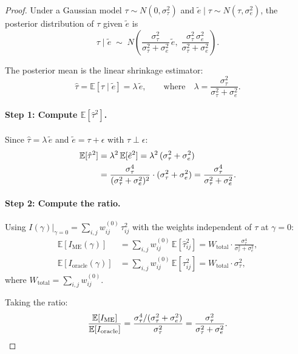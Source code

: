 \documentclass[11pt,a4paper]{article}
\theoremstyle{definition}
\begin{document}
\begin{proof}
Under a Gaussian model
$\tau\sim N(0,\sigma_\tau^2)$ and
$\tilde{e}\mid\tau\sim N(\tau,\sigma_e^2)$,
the posterior distribution of $\tau$ given $\tilde{e}$ is
\begin{equation}\label{eq:posterior}
  \tau\mid\tilde{e} \;\sim\;
  N\!\left(
    \frac{\sigma_\tau^2}{\sigma_\tau^2+\sigma_e^2}\,\tilde{e},\;
    \frac{\sigma_\tau^2\,\sigma_e^2}{\sigma_\tau^2+\sigma_e^2}
  \right).
\end{equation}

The posterior mean is the linear shrinkage estimator:
\begin{equation}\label{eq:shrinkage}
  \hat{\tau}
  = \mathbb{E}[\tau\mid\tilde{e}]
  = \lambda\,\tilde{e},
  \qquad\text{where}\quad
  \lambda = \frac{\sigma_\tau^2}{\sigma_\tau^2+\sigma_e^2}.
\end{equation}

\paragraph{Step 1: Compute $\mathbb{E}[\hat\tau^2]$.}
Since $\hat\tau = \lambda\,\tilde{e}$ and $\tilde{e} = \tau+\epsilon$
with $\tau\perp\epsilon$:
\begin{align}
  \mathbb{E}[\hat\tau^2]
  &= \lambda^2\,\mathbb{E}[\tilde{e}^2]
  = \lambda^2\,(\sigma_\tau^2+\sigma_e^2)
  \notag\\
  &= \frac{\sigma_\tau^4}{(\sigma_\tau^2+\sigma_e^2)^2}
     \cdot(\sigma_\tau^2+\sigma_e^2)
  = \frac{\sigma_\tau^4}{\sigma_\tau^2+\sigma_e^2}.
  \label{eq:E_tauhat_sq}
\end{align}

\paragraph{Step 2: Compute the ratio.}
Using $I(\gamma)|_{\gamma=0} = \sum_{i,j}w_{ij}^{(0)}\,\tau_{ij}^2$
with the weights independent of $\tau$ at $\gamma=0$:
\begin{align}
  \mathbb{E}[I_{\mathrm{ME}}(\gamma)]
  &= \sum_{i,j}w_{ij}^{(0)}\,\mathbb{E}[\hat\tau_{ij}^2]
  = W_{\mathrm{total}}\cdot\frac{\sigma_\tau^4}{\sigma_\tau^2+\sigma_e^2},
  \label{eq:E_I_me}
  \\
  \mathbb{E}[I_{\mathrm{oracle}}(\gamma)]
  &= \sum_{i,j}w_{ij}^{(0)}\,\mathbb{E}[\tau_{ij}^2]
  = W_{\mathrm{total}}\cdot\sigma_\tau^2,
  \label{eq:E_I_oracle}
\end{align}
where $W_{\mathrm{total}}=\sum_{i,j}w_{ij}^{(0)}$.

Taking the ratio:
\begin{equation}
  \frac{\mathbb{E}[I_{\mathrm{ME}}]}{\mathbb{E}[I_{\mathrm{oracle}}]}
  = \frac{\sigma_\tau^4/(\sigma_\tau^2+\sigma_e^2)}{\sigma_\tau^2}
  = \frac{\sigma_\tau^2}{\sigma_\tau^2+\sigma_e^2}.
  \qedhere
\end{equation}
\end{proof}
\end{document}

